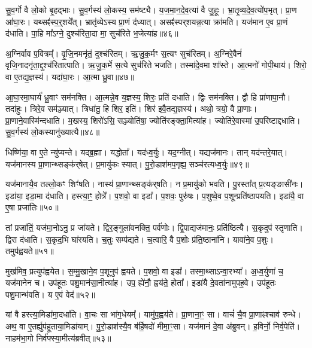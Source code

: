 सु॒व॒र्गो वै लो॒को बृ॒हद्भाः।
सु॒व॒र्गस्य॑ लो॒कस्य॒ सम॑ष्ट्यै।
य॒ज॒मा॒न॒दे॒व॒त्या॑ वै जु॒हूः।
भ्रा॒तृ॒व्य॒दे॒व॒त्यो॑प॒भृत्।
प्रा॒ण आ॑घा॒रः।
यथ्सꣴ॑स्प॒र्॒शये᳚त्।
भ्रातृ॑व्येऽस्य प्रा॒णं द॑ध्यात्।
असꣴ॑स्पर्‌\mbox{}शयन्न॒त्या क्रा॑मति।
यज॑मान ए॒व प्रा॒णं द॑धाति।
पा॒हि मा᳚\-ऽग्ने॒ दुश्च॑रिता॒दा मा॒ सुच॑रिते भ॒जेत्या॑ह॥४६॥

अ॒ग्निर्वाव प॒वित्रम्᳚।
वृ॒जि॒नमनृ॑तं॒ दुश्च॑रितम्।
ऋ॒जु॒क॒र्मꣳ स॒त्यꣳ सुच॑रितम्।
अ॒ग्निरे॒वैनं॑ वृजि॒नादनृ॑ता॒द्दुश्च॑रितात्पाति।
ऋ॒जु॒क॒र्मे स॒त्ये सुच॑रिते भजति।
तस्मा॑दे॒वमा शा᳚स्ते।
आ॒त्मनो॑ गोपी॒थाय॑।
शिरो॒ वा ए॒तद्य॒ज्ञस्य॑।
यदा॑घा॒रः।
आ॒त्मा ध्रु॒वा॥४७॥

आ॒घा॒रमा॒घार्य॑ ध्रु॒वाꣳ सम॑नक्ति।
आ॒त्मन्ने॒व य॒ज्ञस्य॒ शिरः॒ प्रति॑ दधाति।
द्विः सम॑नक्ति।
द्वौ हि प्रा॑णापा॒नौ।
तदा॑हुः।
त्रिरे॒व सम॑ञ्ज्यात्।
त्रिधा॑तु॒ हि शिर॒ इति॑।
शिर॑ इवै॒तद्य॒ज्ञस्य॑।
अथो॒ त्रयो॒ वै प्रा॒णाः।
प्रा॒णाने॒वास्मि॑न्दधाति।
म॒खस्य॒ शिरो॑ऽसि॒ सञ्ज्योति॑षा॒ ज्योति॑रङ्क्ता॒मित्या॑ह।
ज्योति॑रे॒वास्मा॑ उ॒परि॑ष्टाद्दधाति।
सु॒व॒र्गस्य॑ लो॒कस्यानु॑ख्यात्यै॥४८॥\anuvakamend[परि॑दधाति प्रा॒णं द॑धाति॒ हि य॒ज्ञो घा॑रयति॒ नम॒ इत्या॑ह प॒श्चाद्वी॒र्या॑णीत्या॑ह॒ भा इत्या॑ह भ॒जेत्या॑ह ध्रु॒वैवास्मि॑न्दधाति॒ त्रीणि॑ च]

धिष्णि॑या॒ वा ए॒ते न्यु॑प्यन्ते।
यद्ब्र॒ह्मा।
यद्धोता᳚।
यद॑ध्व॒र्युः।
यद॒ग्नीत्।
यद्यज॑मानः।
तान् यद॑न्तरे॒यात्।
यज॑मानस्य प्रा॒णा\-न्थ्सङ्क॑\-र्‌\mbox{}षेत्।
प्र॒मायु॑कः स्यात्।
पु॒रो॒डाश॑मप॒गृह्य॒ सञ्च॑र\-त्यध्व॒र्युः॥४९॥

यज॑मानायै॒व तल्लो॒कꣳ शिꣳ॑षति।
नास्य॑ प्रा॒णान्थ्सङ्क॑र्‌\mbox{}\-षति।
न प्र॒मायु॑को भवति।
पु॒रस्ता᳚त् प्र॒त्यङ्ङासी॑नः।
इडा॑या॒ इडा॒\-मा द॑धाति।
हस्त्या॒ꣳ॒ होत्रे᳚।
प॒शवो॒ वा इडा᳚।
प॒शवः॒ पुरु॑षः।
प॒शुष्वे॒व प॒शून्प्रति॑\-ष्ठापयति।
इडा॑यै॒ वा ए॒षा प्रजा॑तिः॥५०॥

तां प्रजा॑तिं॒ यज॑मा॒नोऽनु॒ प्र जा॑यते।
द्विर॒ङ्गुला॑वनक्ति॒ पर्व॑णोः।
द्वि॒पाद्यज॑मानः॒ प्रति॑\-ष्ठित्यै।
स॒कृदुप॑ स्तृणाति।
द्विरा द॑धाति।
स॒कृद॒भि घा॑रयति।
च॒तुः सम्प॑द्यते।
च॒त्वारि॒ वै प॒शोः प्र॑ति॒ष्ठाना॑नि।
यावा॑ने॒व प॒शुः।
तमुप॑ह्वयते॥५१॥

मुख॑मिव॒ प्रत्युप॑ह्वयेत।
स॒म्मु॒खाने॒व प॒शूनुप॑ ह्वयते।
प॒शवो॒ वा इडा᳚।
तस्मा॒थ्सा\-ऽन्वा॒रभ्या᳚।
अ॒ध्व॒र्युणा॑ च॒ यज॑मानेन च।
उप॑हूतः पशु॒मान॑सा॒नीत्या॑ह।
उप॒ ह्ये॑नौ॒ ह्वय॑ते॒ होता᳚।
इडा॑यै दे॒वता॑नामुपह॒वे।
उप॑हूतः पशु॒मान्भ॑वति।
य ए॒वं वेद॑॥५२॥

यां वै हस्त्या॒मिडा॑मा॒दधा॑ति।
वा॒चः सा भा॑ग॒धेयम्᳚।
यामु॑प॒ह्वय॑ते।
प्रा॒णाना॒ꣳ॒ सा।
वाचं॑ चै॒व प्रा॒णाꣴश्चाव॑ रुन्धे।
अथ॒ वा ए॒तर्ह्युप॑हूताया॒मिडा॑याम्।
पु॒रो॒डाश॑स्यै॒व ब॑र्हि॒षदो॑ मीमा॒ꣳ॒सा।
यज॑मानं दे॒वा अ॑ब्रुवन्।
ह॒विर्नो॒ निर्व॒पेति॑।
नाहम॑भा॒गो निर्व॑फ्स्या॒मीत्य॑ब्रवीत्॥५३॥


